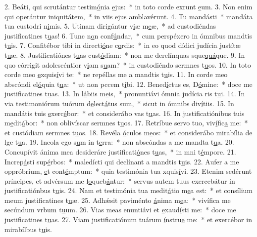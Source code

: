 2. Beáti, qui scrutántur testim\uline{ó}nia \uline{e}jus:~* in toto corde exrunt \uline{e}um.
3. Non enim qui operántur in\uline{i}quit\uline{á}tem,~* in viis ejus amblav\uline{é}runt.
4. T\uline{u} mand\uline{á}sti~* mandáta tua custodri n\uline{i}mis.
5. Utinam dirigántur v\uline{i}æ m\uline{e}æ,~* ad custodiéndas justificatines t\uline{u}as!
6. Tunc n\uline{o}n conf\uline{ú}ndar,~* cum perspéxero in ómnibus mandtis t\uline{u}is.
7. Confitébor tibi in directi\uline{ó}ne c\uline{o}rdis:~* in eo quod dídici judícia justítæ t\uline{u}æ.
8. Justificatiónes t\uline{u}as cust\uline{ó}diam:~* non me derelínquas sque\uline{quá}que.
9. In quo córrigit adolescéntior v\uline{i}am s\uline{u}am?~* in custodiéndo sermnes t\uline{u}os.
10. In toto corde meo \uline{e}xquis\uline{í}vi te:~* ne repéllas me a mandtis t\uline{u}is.
11. In corde meo abscóndi el\uline{ó}quia t\uline{u}a:~* ut non pccem t\uline{i}bi.
12. Bened\uline{í}ctus es, D\uline{ó}mine:~* doce me justificatines t\uline{u}as.
13. In l\uline{á}biis m\uline{e}is,~* pronuntiávi ómnia judícia ris t\uline{u}i.
14. In via testimoniórum tuórum d\uline{e}lect\uline{á}tus sum,~* sicut in ómnibs div\uline{í}tiis.
15. In mandátis tuis \uline{e}xerc\uline{é}bor:~* et considerábo vas t\uline{u}as.
16. In justificatiónibus tuis m\uline{e}dit\uline{á}bor:~* non oblivíscar sermnes t\uline{u}os.
17. Retríbue servo tuo, viv\uline{í}fic\uline{a} me:~* et custódiam sermnes t\uline{u}os.
18. Revéla \uline{ó}culos m\uline{e}os:~* et considerábo mirabília de lge t\uline{u}a.
19. Incola ego s\uline{u}m in t\uline{e}rra:~* non abscóndas a me mandta t\uline{u}a.
20. Concupívit ánima mea desideráre justificati\uline{ó}nes t\uline{u}as,~* in mni t\uline{é}mpore.
21. Increp\uline{á}sti sup\uline{é}rbos:~* maledícti qui declínant a mandtis t\uline{u}is.
22. Aufer a me oppróbrium, \uline{e}t cont\uline{é}mptum:~* quia testimónia tua xquis\uline{í}vi.
23. Etenim sedérunt príncipes, et advérsum me l\uline{o}queb\uline{á}ntur:~* servus autem tuus exercebátur in justificatiónbus t\uline{u}is.
24. Nam et testimónia tua medit\uline{á}tio m\uline{e}a est:~* et consílium meum justificatines t\uline{u}æ.
25. Adhǽsit paviménto \uline{á}nima m\uline{e}a:~* vivífica me secúndum vrbum t\uline{u}um.
26. Vias meas enuntiávi et \uline{e}xaud\uline{í}sti me:~* doce me justificatines t\uline{u}as.
27. Viam justificatiónum tuárum \uline{í}nstru\uline{e} me:~* et exercébor in mirabílbus t\uline{u}is.
